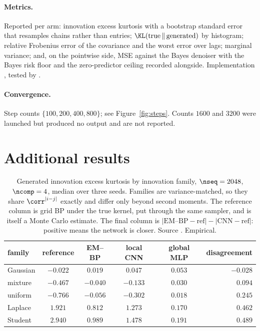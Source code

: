 \paragraph{Metrics.} Reported per arm: innovation excess kurtosis with a bootstrap standard error
that resamples chains rather than entries; $\KL(\text{true}\,\|\,\text{generated})$ by histogram;
relative Frobenius error of the covariance and the worst error over lags; marginal variance;
and, on the pointwise side, MSE against the Bayes denoiser with the Bayes risk floor and the
zero-predictor ceiling recorded alongside. Implementation ,
tested by .

\paragraph{Convergence.} Step counts $\{100,200,400,800\}$; see Figure~\ref{fig:steps}. Counts
$1600$ and $3200$ were launched but produced no output and are not reported.

\section{Additional results}
\label{app:extra}

\begin{table}[h]
\caption{Generated innovation excess kurtosis by innovation family, $\nseq=2048$, $\ncomp=4$,
median over three seeds. Families are variance-matched, so they share $\corr^{|i-j|}$ exactly and
differ only beyond second moments. The reference column is grid BP under the true kernel, put
through the same sampler, and is itself a Monte Carlo estimate. The final column is
$|\text{EM--BP}-\text{ref}| - |\text{CNN}-\text{ref}|$: positive means the network is closer.
Source . Empirical.}
\label{tab:families}
\centering
\begin{tabular}{lccccr}
\toprule
family & reference & EM--BP & local CNN & global MLP & disagreement \\
\midrule
Gaussian & $-0.022$ & $0.019$ & $0.047$ & $0.053$ & $\mathbf{-0.028}$ \\
mixture  & $-0.467$ & $-0.040$ & $-0.133$ & $0.030$ & $0.094$ \\
uniform  & $-0.766$ & $-0.056$ & $-0.302$ & $0.018$ & $0.245$ \\
Laplace  & $1.921$ & $0.812$ & $1.273$ & $0.170$ & $0.462$ \\
Student  & $2.940$ & $0.989$ & $1.478$ & $0.191$ & $0.489$ \\
\bottomrule
\end{tabular}
\end{table}


